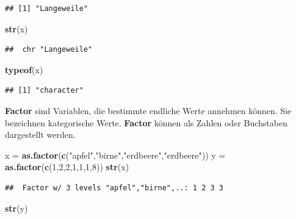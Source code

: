 \documentclass[]{book}
\newenvironment{Shaded}{\begin{snugshade}}{\end{snugshade}}
\newcommand{\KeywordTok}[1]{\textcolor[rgb]{0.13,0.29,0.53}{\textbf{#1}}}
\newcommand{\DecValTok}[1]{\textcolor[rgb]{0.00,0.00,0.81}{#1}}
\newcommand{\StringTok}[1]{\textcolor[rgb]{0.31,0.60,0.02}{#1}}
\newcommand{\NormalTok}[1]{#1}
\begin{document}
\begin{verbatim}
## [1] "Langeweile"
\end{verbatim}

\begin{Shaded}
\begin{Highlighting}[]
\KeywordTok{str}\NormalTok{(x)}
\end{Highlighting}
\end{Shaded}

\begin{verbatim}
##  chr "Langeweile"
\end{verbatim}

\begin{Shaded}
\begin{Highlighting}[]
\KeywordTok{typeof}\NormalTok{(x)}
\end{Highlighting}
\end{Shaded}

\begin{verbatim}
## [1] "character"
\end{verbatim}

\textbf{Factor} sind Variablen, die bestimmte endliche Werte annehmen
können. Sie bezeichnen kategorische Werte. \textbf{Factor} können als
Zahlen oder Buchstaben dargestellt werden.

\begin{Shaded}
\begin{Highlighting}[]
\NormalTok{x =}\StringTok{ }\KeywordTok{as.factor}\NormalTok{(}\KeywordTok{c}\NormalTok{(}\StringTok{"apfel"}\NormalTok{,}\StringTok{"birne"}\NormalTok{,}\StringTok{"erdbeere"}\NormalTok{,}\StringTok{"erdbeere"}\NormalTok{))}
\NormalTok{y =}\StringTok{ }\KeywordTok{as.factor}\NormalTok{(}\KeywordTok{c}\NormalTok{(}\DecValTok{1}\NormalTok{,}\DecValTok{2}\NormalTok{,}\DecValTok{2}\NormalTok{,}\DecValTok{1}\NormalTok{,}\DecValTok{1}\NormalTok{,}\DecValTok{1}\NormalTok{,}\DecValTok{8}\NormalTok{))}
\KeywordTok{str}\NormalTok{(x)}
\end{Highlighting}
\end{Shaded}

\begin{verbatim}
##  Factor w/ 3 levels "apfel","birne",..: 1 2 3 3
\end{verbatim}

\begin{Shaded}
\begin{Highlighting}[]
\KeywordTok{str}\NormalTok{(y)}
\end{Highlighting}
\end{Shaded}
\end{document}
